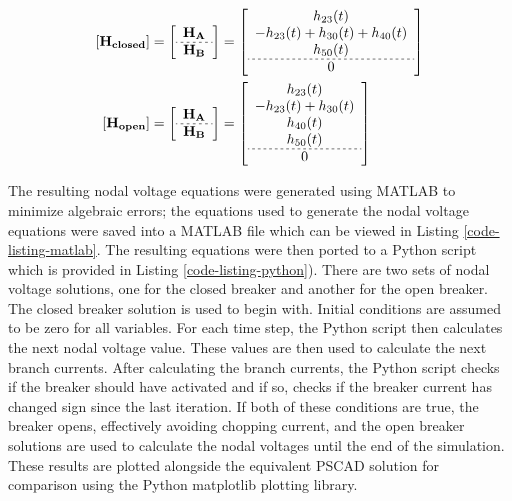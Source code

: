 \documentclass[10pt, oneside, letterpaper]{article}
\begin{document}
\begin{alignat}{2}
  \left[\mathbf{H_{closed}}\right] &= \left[\begin{array}{c} \mathbf{H_{A}} \\ \hdashline[2pt/2pt] \mathbf{H_{B}} \end{array}\right] = \left[\begin{array}{c} h_{23}(t) \\ -h_{23}(t) + h_{30}(t) + h_{40}(t) \\ h_{50}(t) \\ \hdashline[2pt/2pt] 0 \end{array}\right] \\
  \left[\mathbf{H_{open}}\right] &= \left[\begin{array}{c} \mathbf{H_{A}} \\ \hdashline[2pt/2pt] \mathbf{H_{B}} \end{array}\right] = \left[\begin{array}{c} h_{23}(t) \\ -h_{23}(t) + h_{30}(t) \\ h_{40}(t) \\ h_{50}(t) \\ \hdashline[2pt/2pt] 0 \end{array}\right]
\end{alignat}

The resulting nodal voltage equations were generated using MATLAB to minimize algebraic errors; the equations used to generate the nodal voltage equations were saved into a MATLAB file which can be viewed in Listing \ref{code-listing-matlab}. The resulting equations were then ported to a Python script which is provided in Listing \ref{code-listing-python}). There are two sets of nodal voltage solutions, one for the closed breaker and another for the open breaker. The closed breaker solution is used to begin with. Initial conditions are assumed to be zero for all variables. For each time step, the Python script then calculates the next nodal voltage value. These values are then used to calculate the next branch currents. After calculating the branch currents, the Python script checks if the breaker should have activated and if so, checks if the breaker current has changed sign since the last iteration. If both of these conditions are true, the breaker opens, effectively avoiding chopping current, and the open breaker solutions are used to calculate the nodal voltages until the end of the simulation. These results are plotted alongside the equivalent PSCAD solution for comparison using the Python matplotlib plotting library.
\end{document}
